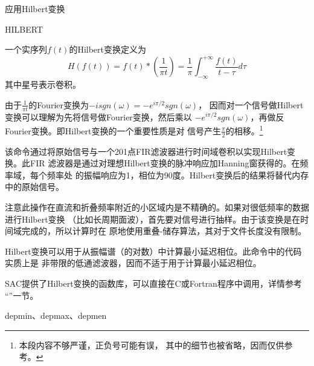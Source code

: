 \label{cmd:hilbert}

应用Hilbert变换

\begin{SACSTX}
HILBERT
\end{SACSTX}

一个实序列$f(t)$的Hilbert变换定义为
\[
    H(f(t)) = f(t) * (\frac{1}{\pi t}) =
    \frac{1}{\pi} \int_{-\infty}^{+\infty} \frac{f(t)}{t-\tau} d\tau
\]
其中星号表示卷积。

由于$\frac{1}{\pi t}$的Fourier变换为$-i sgn(\omega)=-e^{i\pi/2} sgn(\omega)$，
因而对一个信号做Hilbert变换可以理解为先将信号做Fourier变换，然后乘以
$-e^{i\pi/2} sgn(\omega)$，再做反Fourier变换。即Hilbert变换的一个重要性质是对
信号产生$\frac{\pi}{2}$的相移。\footnote{本段内容不够严谨，正负号可能有误，
其中的细节也被省略，因而仅供参考。}

该命令通过将原始信号与一个201点FIR滤波器进行时间域卷积以实现Hilbert变换。此FIR
滤波器是通过对理想Hilbert变换的脉冲响应加Hanning窗获得的。在频率域，每个频率处
的振幅响应为1，相位为90度。Hilbert变换后的结果将替代内存中的原始信号。

注意此操作在直流和折叠频率附近的小区域内是不精确的。如果对很低频率的数据进行Hilbert变换
（比如长周期面波），首先要对信号进行抽样。由于该变换是在时间域完成的，所以计算时在
原地使用重叠-储存算法，其对于文件长度没有限制。

Hilbert变换可以用于从振幅谱（的对数）中计算最小延迟相位。此命令中的代码实质上是
非带限的低通滤波器，因而不适于用于计算最小延迟相位。

SAC提供了Hilbert变换的函数库，可以直接在C或Fortran程序中调用，详情参考
``''一节。

depmin、depmax、depmen
